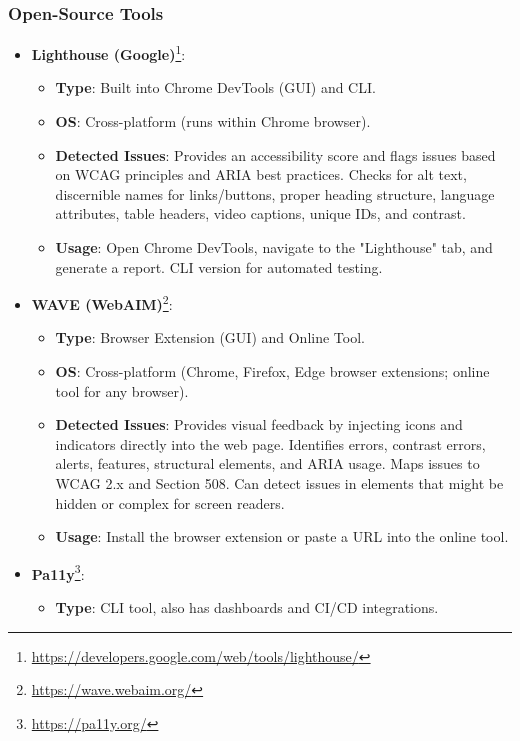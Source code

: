 \subsubsection{Open-Source Tools}
\begin{itemize}
    \item \textbf{Lighthouse (Google)}\footnote{\url{https://developers.google.com/web/tools/lighthouse/}}:
        \begin{itemize}
            \item \textbf{Type}: Built into Chrome DevTools (GUI) and CLI.
            \item \textbf{OS}: Cross-platform (runs within Chrome browser).
            \item \textbf{Detected Issues}: Provides an accessibility score and flags issues based on WCAG principles and ARIA best practices. Checks for alt text, discernible names for links/buttons, proper heading structure, language attributes, table headers, video captions, unique IDs, and contrast.
            \item \textbf{Usage}: Open Chrome DevTools, navigate to the "Lighthouse" tab, and generate a report. CLI version for automated testing.
        \end{itemize}
    \item \textbf{WAVE (WebAIM)}\footnote{\url{https://wave.webaim.org/}}:
        \begin{itemize}
            \item \textbf{Type}: Browser Extension (GUI) and Online Tool.
            \item \textbf{OS}: Cross-platform (Chrome, Firefox, Edge browser extensions; online tool for any browser).
            \item \textbf{Detected Issues}: Provides visual feedback by injecting icons and indicators directly into the web page. Identifies errors, contrast errors, alerts, features, structural elements, and ARIA usage. Maps issues to WCAG 2.x and Section 508. Can detect issues in elements that might be hidden or complex for screen readers.
            \item \textbf{Usage}: Install the browser extension or paste a URL into the online tool.
        \end{itemize}
    \item \textbf{Pa11y}\footnote{\url{https://pa11y.org/}}:
        \begin{itemize}
            \item \textbf{Type}: CLI tool, also has dashboards and CI/CD integrations.

\end{itemize}
\end{itemize}

